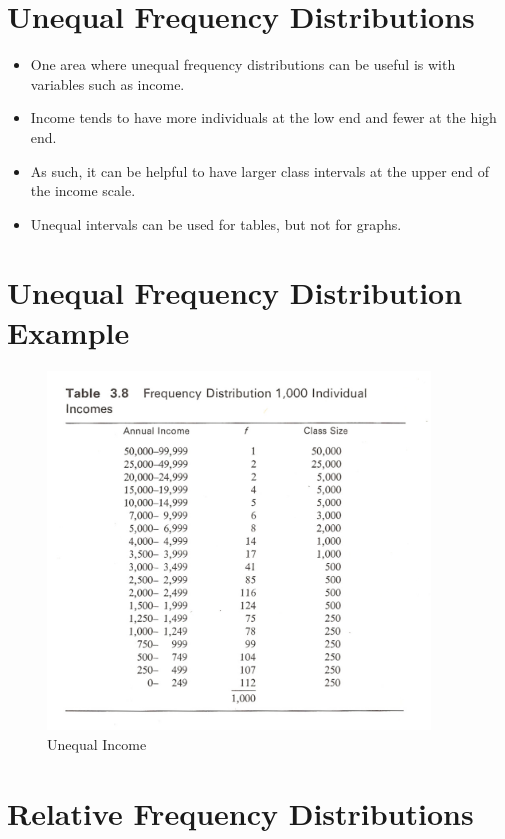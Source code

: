 \documentclass[12pt]{article}
\begin{document}
\section{Unequal Frequency
Distributions}\label{unequal-frequency-distributions}

\begin{itemize}
\itemsep1pt\parskip0pt
\item
  One area where unequal frequency distributions can be useful is with
  variables such as income.
\item
  Income tends to have more individuals at the low end and fewer at the
  high end.
\item
  As such, it can be helpful to have larger class intervals at the upper
  end of the income scale.
\item
  Unequal intervals can be used for tables, but not for graphs.
\end{itemize}

\section{Unequal Frequency Distribution
Example}\label{unequal-frequency-distribution-example}

\begin{figure}[H]
\centering
\includegraphics[width=4in]{Unequal_Income.png}
\caption{Unequal Income}
\end{figure}

\section{Relative Frequency
Distributions}\label{relative-frequency-distributions}
\end{document}
